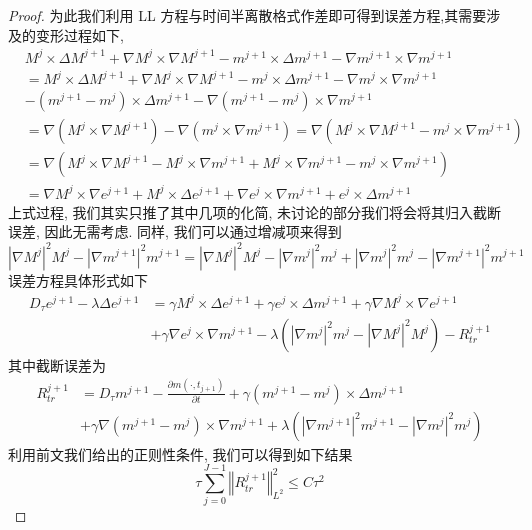 \documentclass[UTF8,a4paper]{article}
\begin{document}
\begin{proof}
为此我们利用 LL 方程与时间半离散格式作差即可得到误差方程,其需要涉及的变形过程如下,
\begin{align*}
  &M^j\times\Delta M^{j+1}+\nabla M^j\times \nabla M^{j+1}-m^{j+1}\times\Delta m^{j+1}-\nabla m^{j+1}\times\nabla m^{j+1}\\
  &= M^j\times\Delta M^{j+1}+\nabla M^j\times\nabla M^{j+1}-m^j\times\Delta m^{j+1}-\nabla m^j\times\nabla m^{j+1}\\
  &-(m^{j+1}-m^j)\times \Delta m^{j+1}-\nabla(m^{j+1}-m^j)\times\nabla m^{j+1}\\
  &=\nabla(M^j\times\nabla M^{j+1})-\nabla(m^j\times\nabla m^{j+1})=\nabla(M^j\times\nabla M^{j+1}-m^j\times\nabla m^{j+1})\\
  &=\nabla \left( M^j\times\nabla M^{j+1}-M^j\times\nabla m^{j+1}+M^j\times\nabla m^{j+1}-m^j\times\nabla m^{j+1}\right)\\
  &=\nabla M^j\times\nabla e^{j+1}+M^j\times\Delta e^{j+1}+\nabla e^{j}\times\nabla m^{j+1}+e^j\times\Delta m^{j+1}
\end{align*}
上式过程, 我们其实只推了其中几项的化简, 未讨论的部分我们将会将其归入截断误差, 因此无需考虑. 同样, 我们可以通过增减项来得到
\begin{equation*}
\left| \nabla M^j \right|^2\!M^j-\left| \nabla m^{j+1} \right|^2\!m^{j+1}\!=\!\left| \nabla M^j \right|^2\!M^j-\left| \nabla m^j \right|^2\!m^j+\left| \nabla m^j \right|^2m^j-\left| \nabla m^{j+1} \right|^2\!m^{j+1}
\end{equation*}
误差方程具体形式如下
\begin{align*}
  D_{\tau}e^{j+1}-\lambda\Delta e^{j+1}&=\gamma M^j\times\Delta e^{j+1}+\gamma e^j\times\Delta m^{j+1}+\gamma\nabla M^j\times\nabla e^{j+1}\\
&+\gamma\nabla e^j\times\nabla m^{j+1}-\lambda(\left| \nabla m^j \right|^2m^j-\left| \nabla M^j \right| ^2M^j)-R_{tr}^{j+1}
\end{align*}
其中截断误差为
\begin{align*}
  R_{tr}^{j+1}&=D_{\tau}m^{j+1}-\frac{\partial m(\cdot,t_{j+1})}{\partial t}+\gamma(m^{j+1}-m^j)\times\Delta m^{j+1}\\
&+\gamma\nabla(m^{j+1}-m^j)\times\nabla m^{j+1}+\lambda(\left| \nabla m^{j+1} \right|^{2 }m^{j+1}-\left| \nabla m^j \right| ^2m^j)
\end{align*}
利用前文我们给出的正则性条件, 我们可以得到如下结果
\begin{equation*}
\tau\sum_{j=0}^{J-1}\left\Vert R_{tr}^{j+1}\right\Vert_{L^2}^2\leq C\tau^2
\end{equation*}

\end{proof}
\end{document}
